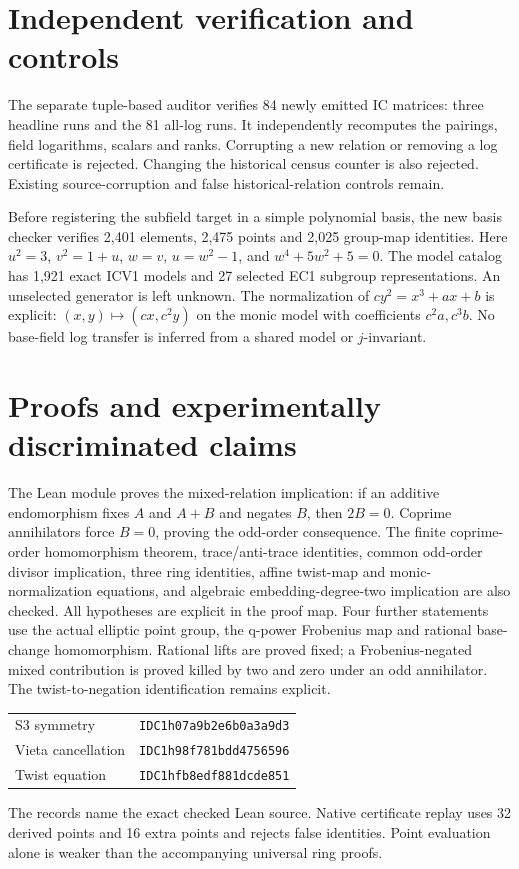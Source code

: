 \documentclass[10pt]{article}
\begin{document}
\newpage
\section*{Independent verification and controls}
The separate tuple-based auditor verifies 84 newly emitted IC matrices: three
headline runs and the 81 all-log runs. It independently recomputes the pairings,
field logarithms, scalars and ranks. Corrupting a new relation or removing a
log certificate is rejected. Changing the historical census counter is also
rejected. Existing source-corruption and false historical-relation controls remain.

Before registering the subfield target in a simple polynomial basis, the new
basis checker verifies 2,401 elements, 2,475 points and 2,025 group-map identities.
Here $u^2=3$, $v^2=1+u$, $w=v$, $u=w^2-1$, and
$w^4+5w^2+5=0$. The model catalog has 1,921 exact ICV1 models and 27 selected
EC1 subgroup representations. An unselected generator is left unknown.
The normalization of $c y^2=x^3+ax+b$ is explicit:
$(x,y)\mapsto(cx,c^2y)$ on the monic model with coefficients $c^2a,c^3b$.
No base-field log transfer is inferred from a shared model or $j$-invariant.

\section*{Proofs and experimentally discriminated claims}
The Lean module proves the mixed-relation implication: if an additive
endomorphism fixes $A$ and $A+B$ and negates $B$, then $2B=0$.
Coprime annihilators force $B=0$, proving the odd-order consequence.
The finite coprime-order homomorphism theorem, trace/anti-trace identities,
common odd-order divisor implication, three ring identities, affine twist-map
and monic-normalization equations, and algebraic embedding-degree-two
implication are also checked. All hypotheses are explicit in the proof map.
Four further statements use the actual elliptic point group, the q-power
Frobenius map and rational base-change homomorphism. Rational lifts are proved
fixed; a Frobenius-negated mixed contribution is proved killed by two and zero
under an odd annihilator. The twist-to-negation identification remains explicit.

\begin{center}\small
\begin{tabular}{ll}
S3 symmetry & \texttt{IDC1h07a9b2e6b0a3a9d3} \\
Vieta cancellation & \texttt{IDC1h98f781bdd4756596} \\
Twist equation & \texttt{IDC1hfb8edf881dcde851}
\end{tabular}\normalsize\end{center}
The records name the exact checked Lean source. Native certificate replay uses
32 derived points and 16 extra points and rejects false identities. Point
evaluation alone is weaker than the accompanying universal ring proofs.
\end{document}
